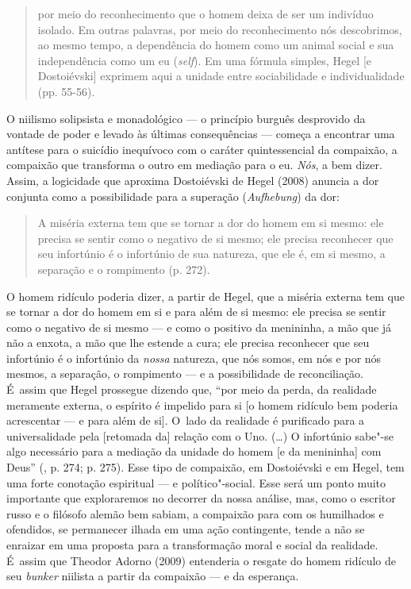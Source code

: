\begin{quote}
por meio do reconhecimento que o homem deixa de ser um indivíduo
isolado. Em outras palavras, por meio do reconhecimento nós descobrimos,
ao mesmo tempo, a dependência do homem como um animal social e sua
independência como um eu (\emph{self}). Em uma fórmula simples, Hegel
{[}e Dostoiévski{]} exprimem aqui a unidade entre sociabilidade e
individualidade (pp. 55-56).
\end{quote}

O niilismo solipsista e monadológico --- o princípio burguês desprovido
da vontade de poder e levado às últimas consequências --- começa a
encontrar uma antítese para o suicídio inequívoco com o caráter
quintessencial da compaixão, a compaixão que transforma o outro em
mediação para o eu. \emph{Nós}, a bem dizer. Assim, a logicidade que
aproxima Dostoiévski de Hegel (2008) anuncia a dor conjunta como a
possibilidade para a superação (\emph{Aufhebung}) da dor:

\begin{quote}
A miséria externa tem que se tornar a dor do homem em si mesmo: ele
precisa se sentir como o negativo de si mesmo; ele precisa reconhecer
que seu infortúnio é o infortúnio de sua natureza, que ele é, em si
mesmo, a separação e o rompimento (p. 272).
\end{quote}

O homem ridículo poderia dizer, a partir de Hegel, que a miséria externa
tem que se tornar a dor do homem em si e para além de si mesmo: ele
precisa se sentir como o negativo de si mesmo --- e como o positivo da
menininha, a mão que já não a enxota, a mão que lhe estende a cura; ele
precisa reconhecer que seu infortúnio é o infortúnio da \emph{nossa}
natureza, que nós somos, em nós e por nós mesmos, a separação, o
rompimento --- e a possibilidade de reconciliação. É~assim que Hegel
prossegue dizendo que, ``por meio da perda, da realidade meramente
externa, o espírito é impelido para si {[}o homem ridículo bem poderia
acrescentar --- e para além de si{]}. O~lado da realidade é purificado
para a universalidade pela {[}retomada da{]} relação com o Uno. (\ldots) O
infortúnio sabe"-se algo necessário para a mediação da unidade do homem
{[}e da menininha{]} com Deus'' (, p. 274; p. 275). Esse tipo de
compaixão, em Dostoiévski e em Hegel, tem uma forte conotação espiritual
--- e político"-social. Esse será um ponto muito importante que
exploraremos no decorrer da nossa análise, mas, como o escritor russo e
o filósofo alemão bem sabiam, a compaixão para com os humilhados e
ofendidos, se permanecer ilhada em uma ação contingente, tende a não se
enraizar em uma proposta para a transformação moral e social da
realidade. É~assim que Theodor Adorno (2009) entenderia o resgate do
homem ridículo de seu \emph{bunker} niilista a partir da compaixão --- e
da esperança.

